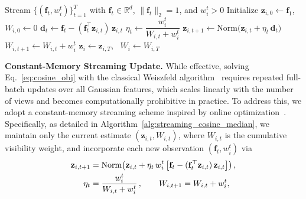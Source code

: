\begin{algorithm}[t!]
\caption{Streaming cosine-loss median on $\mathbb{S}^{d-1}$ (Section~\ref{sec:median}).}
\label{alg:streaming_cosine_median}
\begin{algorithmic}[1]
\Require Stream $\{(\mathbf{f}_t, w_i^t)\}_{t=1}^T$ with $\mathbf{f}_t\in\mathbb{R}^d$, $\|\mathbf{f}_t\|_2=1$, and $w_i^t>0$
\State Initialize $\mathbf{z}_{i,0}\leftarrow \mathbf{f}_1$, \quad $W_{i,0}\leftarrow 0$
    \State $\mathbf{d}_t \leftarrow \mathbf{f}_t - (\mathbf{f}_t^\top \mathbf{z}_{i,t})\,\mathbf{z}_{i,t}$ 
    \State $\eta_t \leftarrow \dfrac{w_i^t}{W_{i,t}+w_i^t}$ 
    \State $\mathbf{z}_{i,t+1} \leftarrow \mathrm{Norm}\!\big(\mathbf{z}_{i,t} + \eta_t\,\mathbf{d}_t\big)$
    \State $W_{i,t+1} \leftarrow W_{i,t} + w_i^t$
\EndFor
\State \Return $\mathbf{z}_i \leftarrow \mathbf{z}_{i,T}$, \ $W_i \leftarrow W_{i,T}$
\end{algorithmic}
\end{algorithm}


\textbf{Constant-Memory Streaming Update.} 
While effective, solving Eq.~\eqref{eq:cosine_obj} with the classical Weiszfeld algorithm~\cite{eckhardt1980weber} requires repeated full-batch updates over all Gaussian features, which scales linearly with the number of views and becomes computationally prohibitive in practice. 
To address this, we adopt a constant-memory streaming scheme inspired by online optimization~\cite{kirillov2023sam}.
Specifically, as detailed in Algorithm~\ref{alg:streaming_cosine_median}, we maintain only the current estimate $(\mathbf{z}_{i,t},W_{i,t})$, where $W_{i,t}$ is the cumulative visibility weight, and incorporate each new observation $(\mathbf{f}_t,w_i^t)$ via
\vspace{-1mm}
\begin{align}
\mathbf{z}_{i,t+1}
&= \mathrm{Norm}\!\left(
\mathbf{z}_{i,t}
+\eta_t\, w_i^t\,
\bigl[\mathbf{f}_t - (\mathbf{f}_t^\top \mathbf{z}_{i,t})\,\mathbf{z}_{i,t}\bigr]
\right), \\
\eta_t &= \frac{w_i^t}{W_{i,t}+w_i^t}\,, \qquad
W_{i,t+1} = W_{i,t} + w_i^t,
\vspace{-2mm}
\end{align}

